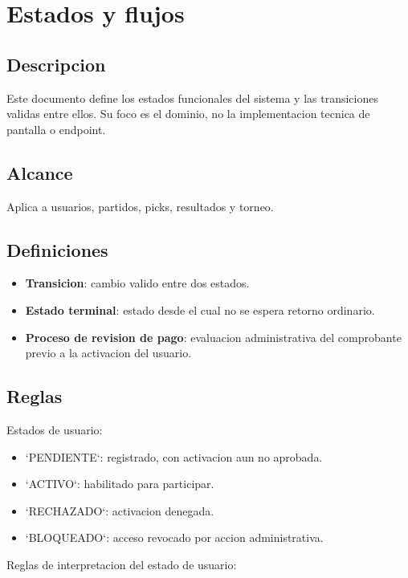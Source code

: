 \section{Estados y flujos}

\subsection{Descripcion}

Este documento define los estados funcionales del sistema y las transiciones validas entre ellos. Su foco es el dominio, no la implementacion tecnica de pantalla o endpoint.

\subsection{Alcance}

Aplica a usuarios, partidos, picks, resultados y torneo.

\subsection{Definiciones}

\begin{itemize}
  \item \textbf{Transicion}: cambio valido entre dos estados.
  \item \textbf{Estado terminal}: estado desde el cual no se espera retorno ordinario.
  \item \textbf{Proceso de revision de pago}: evaluacion administrativa del comprobante previo a la activacion del usuario.
\end{itemize}

\subsection{Reglas}

Estados de usuario:

\begin{itemize}
  \item `PENDIENTE`: registrado, con activacion aun no aprobada.
  \item `ACTIVO`: habilitado para participar.
  \item `RECHAZADO`: activacion denegada.
  \item `BLOQUEADO`: acceso revocado por accion administrativa.
\end{itemize}

Reglas de interpretacion del estado de usuario:

